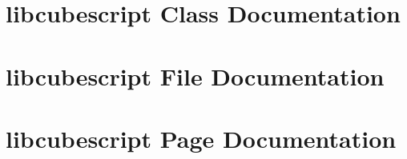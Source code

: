 \documentclass[a4paper]{book}
\begin{document}
\chapter{libcubescript Class Documentation}



























\chapter{libcubescript File Documentation}


\chapter{libcubescript Page Documentation}

\printindex
\end{document}
